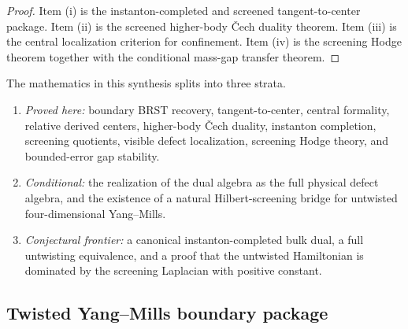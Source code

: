 \begin{proof}
Item (i) is the instanton-completed and screened tangent-to-center package.
Item (ii) is the screened higher-body \v{C}ech duality theorem.
Item (iii) is the central localization criterion for confinement.
Item (iv) is the screening Hodge theorem together with the conditional mass-gap transfer theorem.
\end{proof}

\begin{remark}
\label{rem:status-stratification-platonic-synthesis}
The mathematics in this synthesis splits into three strata.
\begin{enumerate}[label=(\alph*)]
\item \emph{Proved here:} boundary BRST recovery, tangent-to-center, central formality,
relative derived centers, higher-body \v{C}ech duality, instanton completion, screening quotients,
visible defect localization, screening Hodge theory, and bounded-error gap stability.
\item \emph{Conditional:} the realization of the dual algebra as the full physical defect algebra,
and the existence of a natural Hilbert-screening bridge for untwisted four-dimensional Yang--Mills.
\item \emph{Conjectural frontier:} a canonical instanton-completed bulk dual, a full untwisting equivalence,
and a proof that the untwisted Hamiltonian is dominated by the screening Laplacian with positive constant.
\end{enumerate}
\end{remark}


%

\subsection{Twisted Yang--Mills boundary package}
\label{subsec:twisted-ym-boundary-package}

